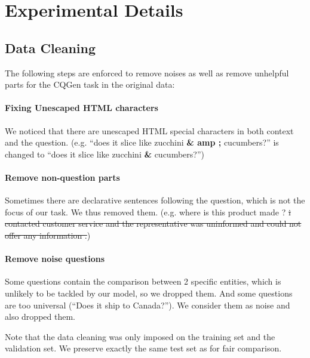 
\section{Experimental Details}
\label{sec:detail}
\subsection{Data Cleaning}
The following steps are enforced to remove noises as well as remove unhelpful parts for the CQGen task in the original data:

\paragraph{Fixing Unescaped HTML characters} We noticed that there are unescaped HTML special characters in both context and the question. (e.g. ``does it slice like zucchini \textbf{\& amp ;} cucumbers?'' is changed to ``does it slice like zucchini \textbf{\&} cucumbers?'')

\paragraph{Remove non-question parts} Sometimes there are declarative sentences following the question, which is not the focus of our task. We thus removed them. (e.g. where is this product made ? \sout{i contacted customer service and the representative was uninformed and could not offer any information .})

\paragraph{Remove noise questions} Some questions contain the comparison between 2 specific entities, which is unlikely to be tackled by our model, so we dropped them. And some questions are too universal (``Does it ship to Canada?''). We consider them as noise and also dropped them.

Note that the data cleaning was only imposed on the training set and the validation set. We preserve exactly the same test set as \citet{rao2019answer} for fair comparison.

